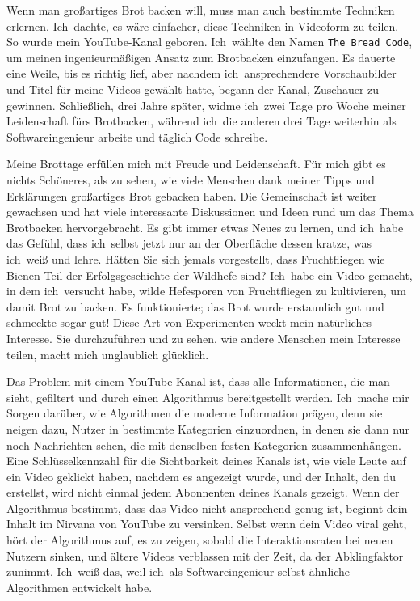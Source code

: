 Wenn man großartiges Brot backen will, muss man auch bestimmte Techniken
erlernen. Ich~dachte, es wäre einfacher, diese Techniken in Videoform zu
teilen. So wurde mein YouTube-Kanal geboren. Ich~wählte den Namen
\texttt{The Bread Code}, um meinen ingenieurmäßigen Ansatz zum Brotbacken
einzufangen. Es dauerte eine Weile, bis es richtig lief, aber nachdem
ich~ansprechendere Vorschaubilder und Titel für meine Videos gewählt hatte,
begann der Kanal, Zuschauer zu gewinnen. Schließlich, drei Jahre später, widme
ich~zwei Tage pro Woche meiner Leidenschaft fürs Brotbacken, während ich~die
anderen drei Tage weiterhin als Softwareingenieur arbeite und täglich Code
schreibe.

Meine Brottage erfüllen mich mit Freude und Leidenschaft. Für mich gibt es
nichts Schöneres, als zu sehen, wie viele Menschen dank meiner Tipps und
Erklärungen großartiges Brot gebacken haben. Die Gemeinschaft ist weiter
gewachsen und hat viele interessante Diskussionen und Ideen rund um das Thema
Brotbacken hervorgebracht. Es gibt immer etwas Neues zu lernen, und
ich~habe das Gefühl, dass ich~selbst jetzt nur an der Oberfläche dessen
kratze, was ich~weiß und lehre. Hätten Sie sich jemals vorgestellt, dass
Fruchtfliegen wie Bienen Teil der Erfolgsgeschichte der Wildhefe sind?
Ich~habe ein Video gemacht, in dem ich~versucht habe, wilde Hefesporen von
Fruchtfliegen zu kultivieren, um damit Brot zu backen. Es funktionierte; das
Brot wurde erstaunlich gut und schmeckte sogar gut! Diese Art von Experimenten
weckt mein natürliches Interesse. Sie durchzuführen und zu sehen, wie andere
Menschen mein Interesse teilen, macht mich unglaublich glücklich.

Das Problem mit einem YouTube-Kanal ist, dass alle Informationen, die man
sieht, gefiltert und durch einen Algorithmus bereitgestellt werden.
Ich~mache mir Sorgen darüber, wie Algorithmen die moderne Information
prägen, denn sie neigen dazu, Nutzer in bestimmte Kategorien einzuordnen, in
denen sie dann nur noch Nachrichten sehen, die mit denselben festen Kategorien
zusammenhängen. Eine Schlüsselkennzahl für die Sichtbarkeit deines Kanals ist,
wie viele Leute auf ein Video geklickt haben, nachdem es angezeigt wurde, und
der Inhalt, den du erstellst, wird nicht einmal jedem Abonnenten deines Kanals
gezeigt. Wenn der Algorithmus bestimmt, dass das Video nicht ansprechend genug
ist, beginnt dein Inhalt im Nirvana von YouTube zu versinken. Selbst wenn dein
Video viral geht, hört der Algorithmus auf, es zu zeigen, sobald die
Interaktionsraten bei neuen Nutzern sinken, und ältere Videos verblassen mit
der Zeit, da der Abklingfaktor zunimmt. Ich~weiß das, weil ich~als
Softwareingenieur selbst ähnliche Algorithmen entwickelt habe.

